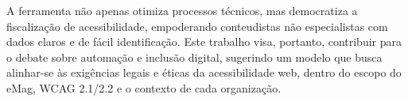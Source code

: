 \documentclass[
	article,			%
	12pt,				%
	oneside,			%
	a4paper,			%
	section=TITLE,		%
	subsection=TITLE,	%
	english,			%
	brazil,				%
	sumario=tradicional
	]{abntex2}
\begin{document}
A ferramenta não apenas otimiza processos técnicos, mas democratiza
a fiscalização de acessibilidade, empoderando conteudistas não especialistas
com dados claros e de fácil identificação. Este trabalho visa, portanto, contribuir
para o debate sobre automação e inclusão digital, sugerindo um modelo que busca alinhar-se às exigências legais e éticas da
acessibilidade web, dentro do escopo do eMag, WCAG 2.1/2.2 e o contexto de cada
organização.











\end{document}
